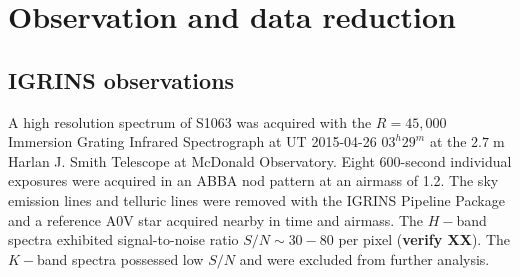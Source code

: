 \documentclass[twocolumn]{emulateapj}%
\begin{document}
\section{Observation and data reduction}
\subsection{IGRINS observations}
A high resolution spectrum of S1063 was acquired with the $R=45,000$ Immersion Grating Infrared Spectrograph \citep[IGRINS;][]{park14} at UT 2015-04-26 $03^h29^m$ at the $2.7\;$m Harlan J. Smith Telescope at McDonald Observatory.  Eight 600-second individual exposures were acquired in an ABBA nod pattern at an airmass of 1.2.  The sky emission lines and telluric lines were removed with the IGRINS Pipeline Package  \citep[PLP;][]{jaejoonlee16} and a reference A0V star acquired nearby in time and airmass.
The $H-$band spectra exhibited signal-to-noise ratio $S/N\sim30-80$ per pixel (\textbf{verify XX}).
The $K-$band spectra possessed low $S/N$ and were excluded from further analysis.
\end{document}
